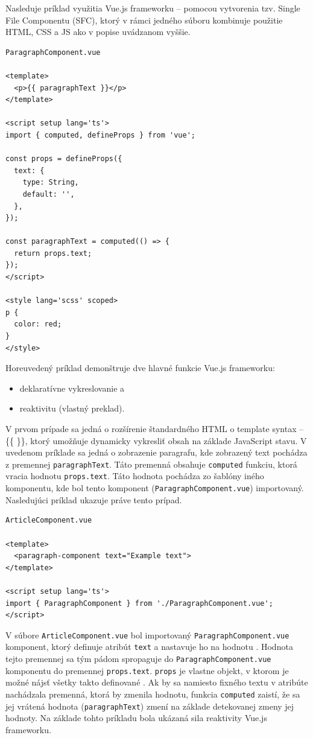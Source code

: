 Nasleduje príklad využitia Vue.js frameworku -- pomocou vytvorenia tzv. Single File Componentu (SFC), ktorý v rámci jedného súboru kombinuje použitie HTML, CSS a JS ako v popise uvádzanom vyššie. \clearpage
\begin{verbatim}
ParagraphComponent.vue

<template>
  <p>{{ paragraphText }}</p>
</template>

<script setup lang='ts'>
import { computed, defineProps } from 'vue';

const props = defineProps({
  text: {
    type: String,
    default: '',
  },
});

const paragraphText = computed(() => {
  return props.text;
});
</script>

<style lang='scss' scoped>
p {
  color: red;
}
</style>
\end{verbatim}

Horeuvedený príklad demonštruje dve hlavné funkcie Vue.js frameworku:
\begin {itemize}
\item {deklaratívne vykreslovanie a}
\item {reaktivitu \cite{vuejs_introduction} (vlastný preklad).}
\end {itemize}

V prvom prípade sa jedná o rozšírenie štandardného HTML o template syntax -- \{\{ \}\}, ktorý umožňuje dynamicky vykresliť obsah na základe JavaScript stavu. V uvedenom príklade sa jedná o zobrazenie paragrafu, kde zobrazený text pochádza z premennej \texttt{paragraphText}. Táto premenná obsahuje \texttt{computed} funkciu, ktorá vracia hodnotu \texttt{props.text}. Táto hodnota pochádza zo šablóny iného komponentu, kde bol tento komponent \newline (\texttt{ParagraphComponent.vue}) importovaný. 
Nasledujúci príklad ukazuje práve tento prípad. \clearpage

\begin{verbatim}
ArticleComponent.vue

<template>
  <paragraph-component text="Example text">
</template>

<script setup lang='ts'>
import { ParagraphComponent } from './ParagraphComponent.vue';
</script>
\end{verbatim}

V súbore \texttt{ArticleComponent.vue} bol importovaný \newline \texttt{ParagraphComponent.vue} komponent, ktorý definuje atribút \texttt{text} a nastavuje ho na hodnotu . Hodnota tejto premennej sa tým pádom spropaguje do \newline
\texttt{ParagraphComponent.vue} komponentu do premennej \texttt{props.text}. \texttt{props} je vlastne objekt, v ktorom je možné nájsť všetky takto definované . Ak by sa namiesto fixného textu v atribúte  nachádzala premenná, ktorá by zmenila hodnotu, funkcia \texttt{computed} zaistí, že sa jej vrátená hodnota (\texttt{paragraphText}) zmení na základe detekovanej zmeny jej hodnoty.
Na základe tohto príkladu bola ukázaná sila reaktivity Vue.js frameworku.

